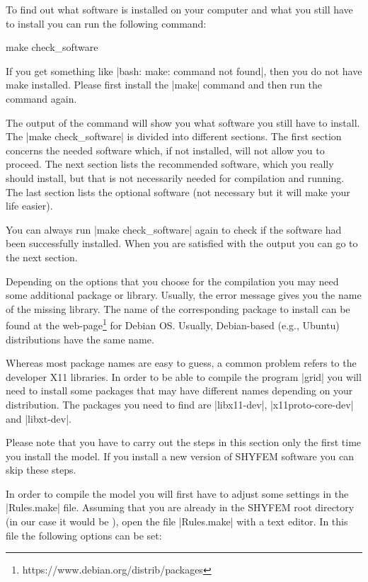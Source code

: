 To find out what software is installed on your computer and what you
still have to install you can run the following command:

\begin{code}
    make check_software
\end{code}

If you get something like |bash: make: command not found|, then you do
not have make installed. Please first install the |make| command and
then run the command again.

The output of the command will show you what software you still have
to install. The |make check_software| is divided into different sections. 
The first section 
concerns the needed software which, if not installed, will not allow you to proceed. 
The next section lists the recommended software, which you really should install,
but that is not necessarily needed for compilation and running. 
The last section lists the optional software (not necessary but it will make your life easier).

You can always run |make check_software| again to check if the software
had been successfully installed. When you are satisfied with the output
you can go to the next section.

Depending on the options that you choose for the compilation you may
need some additional package or library. Usually, the error message
gives you the name of the missing library. The name of the corresponding
package to install can be found at the 
web-page\footnote{https://www.debian.org/distrib/packages} for Debian OS.
Usually, Debian-based (e.g., Ubuntu) distributions have the same name.

Whereas most package names are easy to guess, a common problem refers to
 the developer X11 libraries. In order to be able to compile the
program |grid| you will need to install some packages that may have
different names depending on your distribution. The packages you need to find
 are |libx11-dev|, |x11proto-core-dev| and |libxt-dev|.

Please note that you have to carry out the steps in this section only
the first time you install the model. If you install a new version of
SHYFEM software you can skip these steps.

In order to compile the model you will first have to adjust some settings
in the |Rules.make| file. Assuming that you are already in the SHYFEM
root directory (in our case it would be \ttt{\shydir}), open the file
|Rules.make| with a text editor.  In this file the following options
can be set:

